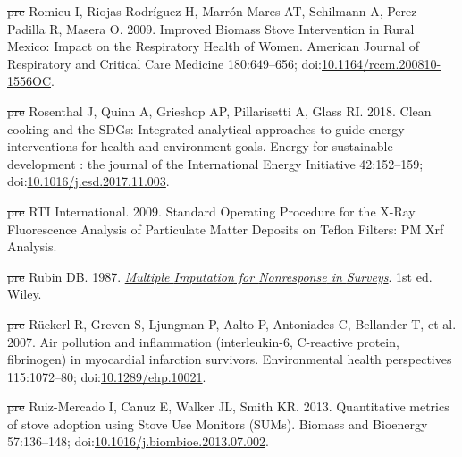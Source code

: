 \documentclass[
  letterpaper,
  DIV=11,
  numbers=noendperiod]{scrartcl}
\newlength{\cslhangindent}
\newenvironment{CSLReferences}[2] %
 {\begin{list}{}{%
  \setlength{\itemindent}{0pt} %
  \setlength{\leftmargin}{0pt} %
  \setlength{\parsep}{0pt} %
  \ifodd #1
   \setlength{\leftmargin}{\cslhangindent} %
   \setlength{\itemindent}{-1\cslhangindent} %
  \fi
  \setlength{\itemsep}{#2\baselineskip}}} %
 {\end{list}} %
\providecommand{\DIFdel}[1]{{\protect\color{red}\sout{#1}}}                      %
\providecommand{\DIFaddbegin}{} %
\providecommand{\DIFaddend}{} %
\providecommand{\DIFdelbegin}{} %
\providecommand{\DIFdelend}{} %
\newcommand{\DIFscaledelfig}{0.5}
\newlength{\DIFdelgraphicswidth} %
\newlength{\DIFdelgraphicsheight} %
\newcommand{\DIFaddincludegraphics}[2][]{{\color{blue}\fbox{\DIFOincludegraphics[#1]{#2}}}} %
\newcommand{\DIFdelincludegraphics}[2][]{%
\sbox{\DIFdelgraphicsbox}{\DIFOincludegraphics[#1]{#2}}%
\settoboxwidth{\DIFdelgraphicswidth}{\DIFdelgraphicsbox} %
\settoboxtotalheight{\DIFdelgraphicsheight}{\DIFdelgraphicsbox} %
\scalebox{\DIFscaledelfig}{%
\parbox[b]{\DIFdelgraphicswidth}{\usebox{\DIFdelgraphicsbox}\\[-\baselineskip] \rule{\DIFdelgraphicswidth}{0em}}\llap{\resizebox{\DIFdelgraphicswidth}{\DIFdelgraphicsheight}{%
\setlength{\unitlength}{\DIFdelgraphicswidth}%
\begin{picture}(1,1)%
\thicklines\linethickness{2pt} %
{\color[rgb]{1,0,0}\put(0,0){\framebox(1,1){}}}%
{\color[rgb]{1,0,0}\put(0,0){\line( 1,1){1}}}%
{\color[rgb]{1,0,0}\put(0,1){\line(1,-1){1}}}%
\end{picture}%
}\hspace*{3pt}}} %
} %
\DeclareRobustCommand{\DIFaddbegin}{\DIFOaddbegin \let\includegraphics\DIFaddincludegraphics} %
\DeclareRobustCommand{\DIFaddend}{\DIFOaddend \let\includegraphics\DIFOincludegraphics} %
\DeclareRobustCommand{\DIFdelbegin}{\DIFOdelbegin \let\includegraphics\DIFdelincludegraphics} %
\DeclareRobustCommand{\DIFdelend}{\DIFOaddend \let\includegraphics\DIFOincludegraphics} %
\begin{document}
\begin{CSLReferences}{1}{1}
\DIFdelbegin %
\DIFdel{pre}%
\DIFdelend \DIFaddbegin {}
\DIFaddend Romieu I, Riojas-Rodríguez H, Marrón-Mares AT, Schilmann A,
Perez-Padilla R, Masera O. 2009. Improved {Biomass Stove Intervention}
in {Rural Mexico}: {Impact} on the {Respiratory Health} of {Women}.
American Journal of Respiratory and Critical Care Medicine 180:649--656;
doi:\href{https://doi.org/10.1164/rccm.200810-1556OC}{10.1164/rccm.200810-1556OC}.

\DIFdelbegin %
\DIFdel{pre}%
\DIFdelend \DIFaddbegin {}
\DIFaddend Rosenthal J, Quinn A, Grieshop AP, Pillarisetti A, Glass RI. 2018. Clean
cooking and the {SDGs}: {Integrated} analytical approaches to guide
energy interventions for health and environment goals. Energy for
sustainable development : the journal of the International Energy
Initiative 42:152--159;
doi:\href{https://doi.org/10.1016/j.esd.2017.11.003}{10.1016/j.esd.2017.11.003}.

\DIFdelbegin %
\DIFdel{pre}%
\DIFdelend \DIFaddbegin {}
\DIFaddend RTI International. 2009. Standard {Operating Procedure} for the {X-Ray
Fluorescence Analysis} of {Particulate Matter Deposits} on {Teflon
Filters}: {PM Xrf Analysis}.

\DIFdelbegin %
\DIFdel{pre}%
\DIFdelend \DIFaddbegin {}
\DIFaddend Rubin DB. 1987.
\emph{\href{https://doi.org/10.1002/9780470316696}{Multiple {Imputation}
for {Nonresponse} in {Surveys}}}. 1st ed. Wiley.

\DIFdelbegin %
\DIFdel{pre}%
\DIFdelend \DIFaddbegin {}
\DIFaddend Rückerl R, Greven S, Ljungman P, Aalto P, Antoniades C, Bellander T, et
al. 2007. Air pollution and inflammation (interleukin-6, {C-reactive}
protein, fibrinogen) in myocardial infarction survivors. Environmental
health perspectives 115:1072--80;
doi:\href{https://doi.org/10.1289/ehp.10021}{10.1289/ehp.10021}.

\DIFdelbegin %
\DIFdel{pre}%
\DIFdelend \DIFaddbegin {}
\DIFaddend Ruiz-Mercado I, Canuz E, Walker JL, Smith KR. 2013. Quantitative metrics
of stove adoption using {Stove Use Monitors} ({SUMs}). Biomass and
Bioenergy 57:136--148;
doi:\href{https://doi.org/10.1016/j.biombioe.2013.07.002}{10.1016/j.biombioe.2013.07.002}.


\end{CSLReferences}
\end{document}
